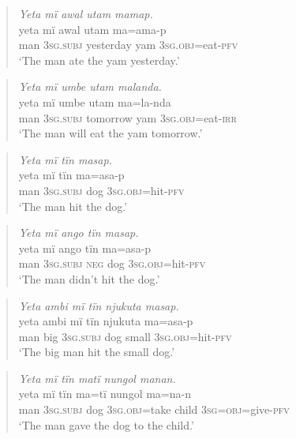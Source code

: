 \begin{quote}\textit{Yeta mï awal utam mamap.}\\
\gll    yeta  mï      awal    utam  ma=ama-p\\
    man  \textsc{3sg.subj}  yesterday  yam  3\textsc{sg.obj}=eat-\textsc{pfv}\\
\glt    ‘The man ate the yam yesterday.’\end{quote}

\begin{quote}\textit{Yeta mï umbe utam malanda.}\\
\gll    yeta  mï      umbe    utam  ma=la-nda\\
    man  \textsc{3sg.subj}  tomorrow  yam  3\textsc{sg.obj}=eat-\textsc{irr}\\
\glt    ‘The man will eat the yam tomorrow.’\end{quote}

\begin{quote}\textit{Yeta mï tïn masap.}\\
\gll    yeta  mï      tïn    ma=asa-p\\
    man  \textsc{3sg.subj}  dog  \textsc{3sg.obj}=hit-\textsc{pfv}\\
\glt    ‘The man hit the dog.’\end{quote}

\begin{quote}\textit{Yeta mï ango tïn masap.}\\
\gll    yeta  mï      ango  tïn    ma=asa-p\\
    man  \textsc{3sg.subj}  \textsc{neg}  dog  \textsc{3sg.obj}=hit-\textsc{pfv}\\
\glt    ‘The man didn’t hit the dog.’\end{quote}

\begin{quote}\textit{Yeta ambi mï tïn njukuta masap.}\\
\gll    yeta  ambi  mï      tïn    njukuta  ma=asa-p\\
    man  big    \textsc{3sg.subj}  dog  small    \textsc{3sg.obj}=hit-\textsc{pfv}\\
\glt    ‘The big man hit the small dog.’\end{quote}

\begin{quote}\textit{Yeta mï tïn matï nungol manan.}\\
\gll    yeta  mï      tïn    ma=tï      nungol  ma=na-n\\
    man  \textsc{3sg.subj}  dog  \textsc{3sg.obj}=take  child  \textsc{3sg=obj}=give-\textsc{pfv}\\
\glt    ‘The man gave the dog to the child.’\end{quote}


